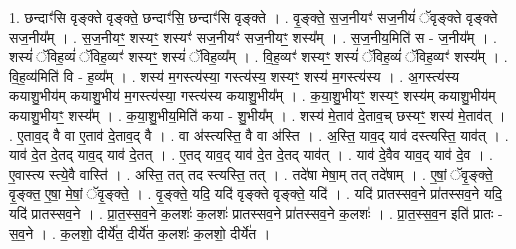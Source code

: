 \documentclass[17pt]{extarticle}
\begin{document}
1. छन्दाꣳ॑सि वृङ्क्ते वृङ्क्ते॒ छन्दाꣳ॑सि॒ छन्दाꣳ॑सि वृङ्क्ते । . वृ॒ङ्क्ते॒ स॒ज॒नीयꣳ॑ सज॒नीयं॑ ॅवृङ्क्ते वृङ्क्ते सज॒नीय᳚म् । . स॒ज॒नीयꣳ॒॒ शस्यꣳ॒॒ शस्यꣳ॑ सज॒नीयꣳ॑ सज॒नीयꣳ॒॒ शस्य᳚म् । . स॒ज॒नीय॒मिति॑ स - ज॒नीय᳚म् । . शस्यं॑ ॅविह॒व्यं॑ ॅविह॒व्यꣳ॑ शस्यꣳ॒॒ शस्यं॑ ॅविह॒व्य᳚म् । . वि॒ह॒व्यꣳ॑ शस्यꣳ॒॒ शस्यं॑ ॅविह॒व्यं॑ ॅविह॒व्यꣳ॑ शस्य᳚म् । . वि॒ह॒व्य॑मिति॑ वि - ह॒व्य᳚म् । . शस्य॑ म॒गस्त्य॑स्या॒ गस्त्य॑स्य॒ शस्यꣳ॒॒ शस्य॑ म॒गस्त्य॑स्य । . अ॒गस्त्य॑स्य कयाशु॒भीय॑म् कयाशु॒भीय॑ म॒गस्त्य॑स्या॒ गस्त्य॑स्य कयाशु॒भीय᳚म् । . क॒या॒शु॒भीयꣳ॒॒ शस्यꣳ॒॒ शस्य॑म् कयाशु॒भीय॑म् कयाशु॒भीयꣳ॒॒ शस्य᳚म् । . क॒या॒शु॒भीय॒मिति॑ कया - शु॒भीय᳚म् । . शस्य॑ मे॒ताव॑ दे॒ताव॒च् छस्यꣳ॒॒ शस्य॑ मे॒ताव॑त् । . ए॒ताव॒द् वै वा ए॒ताव॑ दे॒ताव॒द् वै । . वा अ॑स्त्यस्ति॒ वै वा अ॑स्ति । . अ॒स्ति॒ याव॒द् याव॑ दस्त्यस्ति॒ याव॑त् । . याव॑ दे॒त दे॒तद् याव॒द् याव॑ दे॒तत् । . ए॒तद् याव॒द् याव॑ दे॒त दे॒तद् याव॑त् । . याव॑ दे॒वैव याव॒द् याव॑ दे॒व । . ए॒वास्त्य स्त्ये॒वै वास्ति॑ । . अस्ति॒ तत् तद स्त्यस्ति॒ तत् । . तदे॑षा मेषा॒म् तत् तदे॑षाम् । . ए॒षां॒ ॅवृ॒ङ्क्ते॒ वृ॒ङ्क्त॒ ए॒षा॒ मे॒षां॒ ॅवृ॒ङ्क्ते॒ । . वृ॒ङ्क्ते॒ यदि॒ यदि॑ वृङ्क्ते वृङ्क्ते॒ यदि॑ । . यदि॑ प्रातस्सव॒ने प्रा॑तस्सव॒ने यदि॒ यदि॑ प्रातस्सव॒ने । . प्रा॒त॒स्स॒व॒ने क॒लशः॑ क॒लशः॑ प्रातस्सव॒ने प्रा॑तस्सव॒ने क॒लशः॑ । . प्रा॒त॒स्स॒व॒न इति॑ प्रातः - स॒व॒ने । . क॒लशो॒ दीर्ये॑त॒ दीर्ये॑त क॒लशः॑ क॒लशो॒ दीर्ये॑त । \newline
\end{document}
